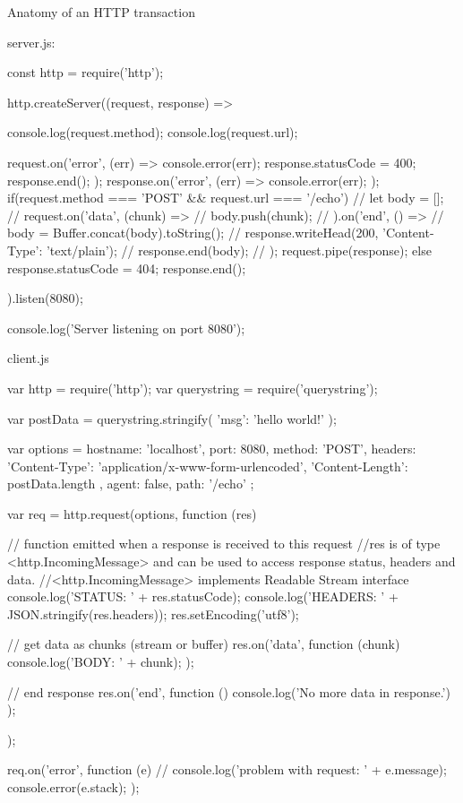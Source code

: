 \documentclass[a4paper,12pt]{article}
\begin{document}
\begin{description}
\item Anatomy of an HTTP transaction

server.js:
\begin{jscode}
const http = require('http');

http.createServer((request, response) => {
	console.log(request.method);
	console.log(request.url);
	
	request.on('error', (err) => {
		console.error(err);
		response.statusCode = 400;
		response.end();
	});
	response.on('error', (err) => {
		console.error(err);
	});
	if(request.method === 'POST' && request.url === '/echo'){
		// let body = [];
		// request.on('data', (chunk) => {
		//     body.push(chunk);
		// }).on('end', () => {
		//     body = Buffer.concat(body).toString();
		//     response.writeHead(200, {'Content-Type': 'text/plain'});
		//     response.end(body);
		// });
		request.pipe(response);
	}else {
		response.statusCode = 404;
		response.end();
	}
}).listen(8080);

console.log('Server listening on port 8080');
\end{jscode}	

client.js
\begin{jscode}
var http = require('http');
var querystring = require('querystring');

var postData = querystring.stringify({
	'msg': 'hello world!'
});

var options = {
	hostname: 'localhost',
	port: 8080,
	method: 'POST',
	headers: {
		'Content-Type': 'application/x-www-form-urlencoded',
		'Content-Length': postData.length
	},
	agent: false,
	path: '/echo'
};

var req = http.request(options, function (res) {// function emitted when a response is received to this request
	//res is of type <http.IncomingMessage> and can be used to access response status, headers and data.
	//<http.IncomingMessage> implements Readable Stream interface
	console.log('STATUS: ' + res.statusCode);
	console.log('HEADERS: ' + JSON.stringify(res.headers));
	res.setEncoding('utf8');
	
	// get data as chunks (stream or buffer)
	res.on('data', function (chunk) {
		console.log('BODY: ' + chunk);
	});
	
	// end response
	res.on('end', function () {
		console.log('No more data in response.')
	});
});

req.on('error', function (e) {
	// console.log('problem with request: ' + e.message);
	console.error(e.stack);
});


\end{jscode}
\end{description}
\end{document}
